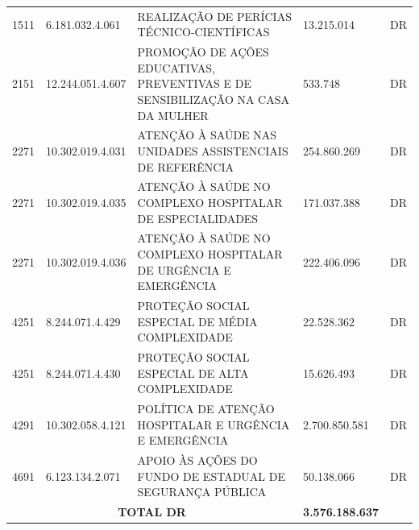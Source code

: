\documentclass{article}
\begin{document}
\begin{longtable}[c]{m{1cm}|m{2cm}|m{10cm}|m{2cm}|m{1cm}}
\multicolumn{1}{C{1cm}|}{1511} & \multicolumn{1}{C{2cm}|}{6.181.032.4.061} & \multicolumn{1}{L{10cm}|}{REALIZAÇÃO DE PERÍCIAS TÉCNICO-CIENTÍFICAS} & \multicolumn{1}{R{2cm}|}{13.215.014} & \multicolumn{1}{C{1cm}}{DR} \\
\multicolumn{1}{C{1cm}|}{2151} & \multicolumn{1}{C{2cm}|}{12.244.051.4.607} & \multicolumn{1}{L{10cm}|}{PROMOÇÃO DE AÇÕES EDUCATIVAS, PREVENTIVAS E DE SENSIBILIZAÇÃO NA CASA DA MULHER} & \multicolumn{1}{R{2cm}|}{533.748} & \multicolumn{1}{C{1cm}}{DR} \\
\multicolumn{1}{C{1cm}|}{2271} & \multicolumn{1}{C{2cm}|}{10.302.019.4.031} & \multicolumn{1}{L{10cm}|}{ATENÇÃO À SAÚDE NAS UNIDADES ASSISTENCIAIS DE REFERÊNCIA} & \multicolumn{1}{R{2cm}|}{254.860.269} & \multicolumn{1}{C{1cm}}{DR} \\
\multicolumn{1}{C{1cm}|}{2271} & \multicolumn{1}{C{2cm}|}{10.302.019.4.035} & \multicolumn{1}{L{10cm}|}{ATENÇÃO À SAÚDE NO COMPLEXO HOSPITALAR DE ESPECIALIDADES} & \multicolumn{1}{R{2cm}|}{171.037.388} & \multicolumn{1}{C{1cm}}{DR} \\
\multicolumn{1}{C{1cm}|}{2271} & \multicolumn{1}{C{2cm}|}{10.302.019.4.036} & \multicolumn{1}{L{10cm}|}{ATENÇÃO À SAÚDE NO COMPLEXO HOSPITALAR DE URGÊNCIA E EMERGÊNCIA} & \multicolumn{1}{R{2cm}|}{222.406.096} & \multicolumn{1}{C{1cm}}{DR} \\
\multicolumn{1}{C{1cm}|}{4251} & \multicolumn{1}{C{2cm}|}{8.244.071.4.429} & \multicolumn{1}{L{10cm}|}{PROTEÇÃO SOCIAL ESPECIAL DE MÉDIA COMPLEXIDADE} & \multicolumn{1}{R{2cm}|}{22.528.362} & \multicolumn{1}{C{1cm}}{DR} \\
\multicolumn{1}{C{1cm}|}{4251} & \multicolumn{1}{C{2cm}|}{8.244.071.4.430} & \multicolumn{1}{L{10cm}|}{PROTEÇÃO SOCIAL ESPECIAL DE ALTA COMPLEXIDADE} & \multicolumn{1}{R{2cm}|}{15.626.493} & \multicolumn{1}{C{1cm}}{DR} \\
\multicolumn{1}{C{1cm}|}{4291} & \multicolumn{1}{C{2cm}|}{10.302.058.4.121} & \multicolumn{1}{L{10cm}|}{POLÍTICA DE ATENÇÃO HOSPITALAR E URGÊNCIA E EMERGÊNCIA} & \multicolumn{1}{R{2cm}|}{2.700.850.581} & \multicolumn{1}{C{1cm}}{DR} \\
\multicolumn{1}{C{1cm}|}{4691} & \multicolumn{1}{C{2cm}|}{6.123.134.2.071} & \multicolumn{1}{L{10cm}|}{APOIO ÀS AÇÕES DO FUNDO DE ESTADUAL DE SEGURANÇA PÚBLICA} & \multicolumn{1}{R{2cm}|}{50.138.066} & \multicolumn{1}{C{1cm}}{DR} \\
\hline\hline
\multicolumn{3}{c|}{ \textbf{TOTAL DR}} & \multicolumn{1}{R{2cm}|}{ \textbf{3.576.188.637}} &  \\

\end{longtable}
\end{document}
